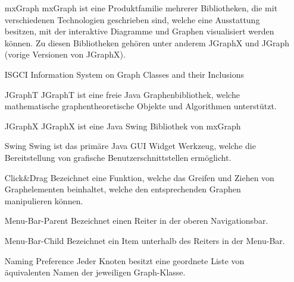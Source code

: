 \documentclass[10pt,a4paper]{article}
\begin{document}
	        \begin{itemize}
	        \item[mxGraph] mxGraph ist eine Produktfamilie mehrerer Bibliotheken, die mit verschiedenen Technologien geschrieben sind, welche eine Ausstattung besitzen, mit der interaktive Diagramme und Graphen visualisiert werden können. Zu diesen Bibliotheken gehören unter anderem JGraphX und JGraph (vorige Versionen von JGraphX).
	        \item[ISGCI] Information System on Graph Classes and their Inclusions
	        \item[JGraphT] JGraphT ist eine freie Java Graphenbibliothek, welche mathematische graphentheoretische Objekte und Algorithmen unterstützt. 
	        \item[JGraphX] JGraphX ist eine Java Swing Bibliothek von mxGraph
	        \item[Swing] Swing ist das primäre Java GUI Widget Werkzeug, welche die Bereitstellung von grafische Benutzerschnittstellen ermöglicht.
	        \item[Click\&Drag] Bezeichnet eine Funktion, welche das Greifen und Ziehen von Graphelementen beinhaltet, welche den entsprechenden Graphen manipulieren können.
	        \item[Menu-Bar-Parent] Bezeichnet einen Reiter in der oberen Navigationsbar.
	        \item[Menu-Bar-Child] Bezeichnet ein Item unterhalb des Reiters in der Menu-Bar.
	        \item[Naming Preference] Jeder Knoten besitzt eine geordnete Liste von äquivalenten Namen der jeweiligen Graph-Klasse.
	        \end{itemize}
	        \newpage
\end{document}
